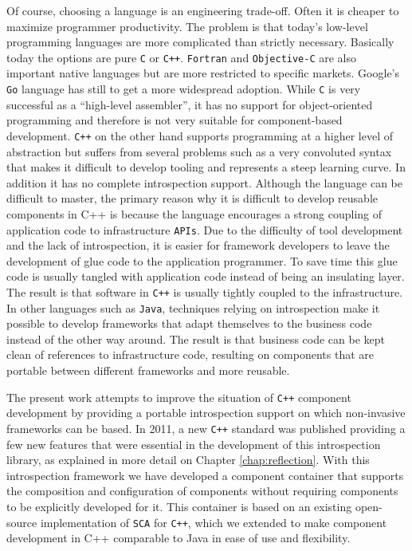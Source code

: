Of course, choosing a language is an engineering trade-off. Often it is cheaper to maximize programmer
productivity. The problem is that today's low-level programming languages are more complicated than
strictly necessary. Basically today the options are pure \texttt{C} or \texttt{C++}. \texttt{Fortran}
and \texttt{Objective-C} are also important native languages but are more restricted to specific markets.
Google's \texttt{Go} language has still to get a more widespread adoption. While \texttt{C} is very
successful as a ``high-level assembler'', it has no support for object-oriented programming and therefore
is not very suitable for component-based development. \texttt{C++} on the other hand supports programming
at a higher level of abstraction but suffers from several problems such as a very convoluted syntax that
makes it difficult to develop tooling and represents a steep learning curve. In addition it has no complete
introspection support. Although the language can be difficult to master, the primary reason why it is difficult
to develop reusable components in C++ is because the language encourages a strong coupling of application code
to infrastructure \texttt{APIs}. Due to the difficulty of tool development and the lack of introspection,
it is easier for framework developers to leave the development of glue code to the application
programmer. To save time this glue code is usually tangled with application code instead of being an insulating
layer. The result is that software in \texttt{C++} is usually tightly coupled to the infrastructure. In other languages
such as \texttt{Java}, techniques relying on introspection make it possible to develop frameworks that adapt
themselves to the business code instead of the other way around. The result is that business code can be kept
clean of references to infrastructure code, resulting on components that are portable between different frameworks and more reusable.

The present work attempts to improve the situation of \texttt{C++} component development by providing a portable
introspection support on which non-invasive frameworks can be based. In 2011, a new \texttt{C++} standard was published
\cite{CPP11} providing a few new features that were essential in the development of this introspection library, as explained in more detail on Chapter \ref{chap:reflection}.
With this introspection framework we have developed a component container that supports the composition and configuration
of components without requiring components to be explicitly developed for it. This container is based on an existing
open-source implementation of \texttt{SCA} for \texttt{C++}, which we extended to make component development in C++ comparable
to Java in ease of use and flexibility.

